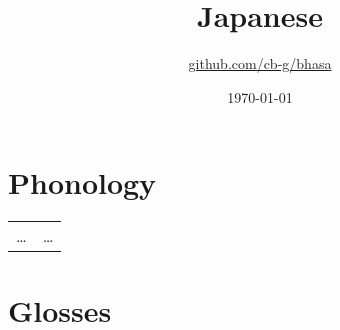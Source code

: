 \documentclass{article}
\title{Japanese\\\ipa{[NihoNgo]}}
\author{\href{https://github.com/cb-g/bhasa}{github.com/cb-g/bhasa}}
\date{\today}
\begin{document}
\pagecolor{custom_bg}\color{custom_fg}
\maketitle\thispagestyle{empty}

\newpage\setcounter{page}{1}\section{Phonology}

\begin{xltabular}{\textwidth}{lL}
  \dots & \dots \\
\end{xltabular}

\newpage\section{Glosses}
\end{document}

